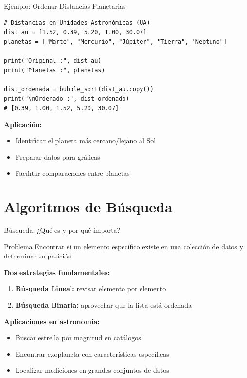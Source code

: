 \documentclass[10pt]{beamer}
\begin{document}
\begin{frame}[fragile]{Ejemplo: Ordenar Distancias Planetarias}
\begin{verbatim}
# Distancias en Unidades Astronómicas (UA)
dist_au = [1.52, 0.39, 5.20, 1.00, 30.07]
planetas = ["Marte", "Mercurio", "Júpiter", "Tierra", "Neptuno"]

print("Original :", dist_au)
print("Planetas :", planetas)

dist_ordenada = bubble_sort(dist_au.copy())
print("\nOrdenado :", dist_ordenada)
# [0.39, 1.00, 1.52, 5.20, 30.07]
\end{verbatim}

\textbf{Aplicación:}
\begin{itemize}
  \item Identificar el planeta más cercano/lejano al Sol
  \item Preparar datos para gráficas
  \item Facilitar comparaciones entre planetas
\end{itemize}
\end{frame}

\section{Algoritmos de Búsqueda}

\begin{frame}{Búsqueda: ¿Qué es y por qué importa?}
  \begin{block}{Problema}
    Encontrar si un elemento específico existe en una colección de datos 
    y determinar su posición.
  \end{block}
  
  \vspace{0.3cm}
  \textbf{Dos estrategias fundamentales:}
  \begin{enumerate}
    \item \textbf{Búsqueda Lineal:} revisar elemento por elemento
    \item \textbf{Búsqueda Binaria:} aprovechar que la lista está ordenada
  \end{enumerate}
  
  \vspace{0.3cm}
  \textbf{Aplicaciones en astronomía:}
  \begin{itemize}
    \item Buscar estrella por magnitud en catálogos
    \item Encontrar exoplaneta con características específicas
    \item Localizar mediciones en grandes conjuntos de datos
  \end{itemize}
\end{frame}
\end{document}
